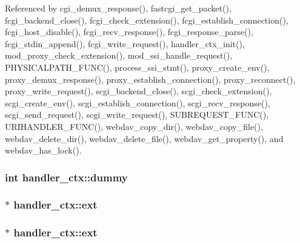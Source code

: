 Referenced by cgi\-\_\-demux\-\_\-response(), fastcgi\-\_\-get\-\_\-packet(), fcgi\-\_\-backend\-\_\-close(), fcgi\-\_\-check\-\_\-extension(), fcgi\-\_\-establish\-\_\-connection(), fcgi\-\_\-host\-\_\-disable(), fcgi\-\_\-recv\-\_\-response(), fcgi\-\_\-response\-\_\-parse(), fcgi\-\_\-stdin\-\_\-append(), fcgi\-\_\-write\-\_\-request(), handler\-\_\-ctx\-\_\-init(), mod\-\_\-proxy\-\_\-check\-\_\-extension(), mod\-\_\-ssi\-\_\-handle\-\_\-request(), P\-H\-Y\-S\-I\-C\-A\-L\-P\-A\-T\-H\-\_\-\-F\-U\-N\-C(), process\-\_\-ssi\-\_\-stmt(), proxy\-\_\-create\-\_\-env(), proxy\-\_\-demux\-\_\-response(), proxy\-\_\-establish\-\_\-connection(), proxy\-\_\-reconnect(), proxy\-\_\-write\-\_\-request(), scgi\-\_\-backend\-\_\-close(), scgi\-\_\-check\-\_\-extension(), scgi\-\_\-create\-\_\-env(), scgi\-\_\-establish\-\_\-connection(), scgi\-\_\-recv\-\_\-response(), scgi\-\_\-send\-\_\-request(), scgi\-\_\-write\-\_\-request(), S\-U\-B\-R\-E\-Q\-U\-E\-S\-T\-\_\-\-F\-U\-N\-C(), U\-R\-I\-H\-A\-N\-D\-L\-E\-R\-\_\-\-F\-U\-N\-C(), webdav\-\_\-copy\-\_\-dir(), webdav\-\_\-copy\-\_\-file(), webdav\-\_\-delete\-\_\-dir(), webdav\-\_\-delete\-\_\-file(), webdav\-\_\-get\-\_\-property(), and webdav\-\_\-has\-\_\-lock().

\hypertarget{structhandler__ctx_ad94377aa5408f430d287b91bc173526d}{
\subsubsection[{dummy}]{\setlength{\rightskip}{0pt plus 5cm}int handler\-\_\-ctx\-::dummy}}\label{structhandler__ctx_ad94377aa5408f430d287b91bc173526d}
\hypertarget{structhandler__ctx_abb79ce25f2dad69970a556bedb47c1e6}{
\subsubsection[{ext}]{$\ast$ handler\-\_\-ctx\-::ext}}\label{structhandler__ctx_abb79ce25f2dad69970a556bedb47c1e6}
\hypertarget{structhandler__ctx_ad4293a11c9be9e5a38980d9fcea1bf67}{
\subsubsection[{ext}]{$\ast$ handler\-\_\-ctx\-::ext}}\label{structhandler__ctx_ad4293a11c9be9e5a38980d9fcea1bf67}


